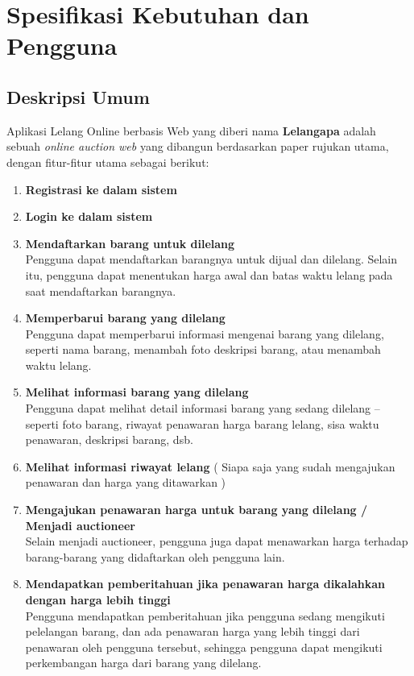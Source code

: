 \section{Spesifikasi Kebutuhan dan Pengguna}
   
  \subsection{Deskripsi Umum}
  
  Aplikasi Lelang Online berbasis Web yang diberi nama \textbf{Lelangapa} adalah sebuah \textit{online auction web} yang dibangun berdasarkan paper rujukan utama, dengan fitur-fitur utama sebagai berikut:
  
  \begin{enumerate}
  \item \textbf{Registrasi ke dalam sistem}
    \item \textbf{Login ke dalam sistem}
    \item \textbf{Mendaftarkan barang untuk dilelang} \\
        Pengguna dapat mendaftarkan barangnya untuk dijual dan dilelang. Selain itu, pengguna dapat menentukan harga awal dan batas waktu lelang pada saat mendaftarkan barangnya.
    \item \textbf{Memperbarui barang yang dilelang} \\
        Pengguna dapat memperbarui informasi mengenai barang yang dilelang, seperti nama barang, menambah foto deskripsi barang, atau menambah waktu lelang.
    \item \textbf{Melihat informasi barang yang dilelang} \\
        Pengguna dapat melihat detail informasi barang yang sedang dilelang – seperti foto barang, riwayat penawaran harga barang lelang, sisa waktu penawaran, deskripsi barang, dsb.
    \item \textbf{Melihat informasi riwayat lelang} ( Siapa saja yang sudah mengajukan penawaran dan harga yang ditawarkan )
    \item \textbf{Mengajukan penawaran harga untuk barang yang dilelang / Menjadi auctioneer} \\
        Selain menjadi auctioneer, pengguna juga dapat menawarkan harga terhadap barang-barang yang didaftarkan oleh pengguna lain.
    \item \textbf{Mendapatkan pemberitahuan jika penawaran harga dikalahkan dengan harga lebih tinggi} \\
        Pengguna mendapatkan pemberitahuan jika pengguna sedang mengikuti pelelangan barang, dan ada penawaran harga yang lebih tinggi dari penawaran oleh pengguna tersebut, sehingga pengguna dapat mengikuti perkembangan harga dari barang yang dilelang.

\end{enumerate}
